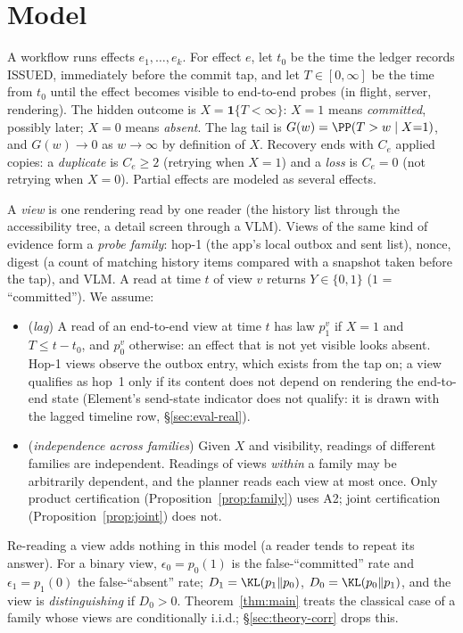 \section{Model}
\label{sec:model}

A workflow runs effects $e_1,\dots,e_k$. For effect $e$, let $t_0$ be the time the ledger records \textsf{ISSUED}, immediately before the commit tap,
and let $T\in[0,\infty]$ be the time from $t_0$ until the effect becomes visible to end-to-end probes (in flight, server, rendering).
The hidden outcome is $X=\mathbf 1\{T<\infty\}$: $X{=}1$ means \emph{committed}, possibly later; $X{=}0$ means \emph{absent}. The lag tail is
$G(w)=\PP(T>w\mid X{=}1)$, and $G(w)\to0$ as $w\to\infty$ by definition of $X$. Recovery ends with $C_e$ applied copies: a \emph{duplicate} is $C_e\ge2$
(retrying when $X{=}1$) and a \emph{loss} is $C_e=0$ (not retrying when $X{=}0$). Partial effects are modeled as several effects.

A \emph{view} is one rendering read by one reader (the history list through the accessibility tree, a detail screen through a VLM). Views of the same kind of evidence form a \emph{probe family}: hop-1 (the app's local outbox and sent list), nonce, digest
(a count of matching history items compared with a snapshot taken before the tap), and VLM. A read at time $t$ of view $v$ returns $Y\in\{0,1\}$ ($1$ = ``committed'').
We assume:
\begin{itemize}[leftmargin=*,topsep=1pt,itemsep=0pt]
\item[\textbf{A1}] (\emph{lag}) A read of an end-to-end view at time $t$ has law $p^v_1$ if $X{=}1$ and $T\le t-t_0$, and $p^v_0$ otherwise:
an effect that is not yet visible looks absent. Hop-1 views observe the outbox entry, which exists from the tap on; a view qualifies as hop~1 only if its content
does not depend on rendering the end-to-end state (Element's send-state indicator does not qualify: it is drawn with the lagged timeline row, \S\ref{sec:eval-real}).
\item[\textbf{A2}] (\emph{independence across families}) Given $X$ and visibility, readings of different families are independent.
Readings of views \emph{within} a family may be arbitrarily dependent, and the planner reads each view at most once. Only product certification
(Proposition~\ref{prop:family}) uses A2; joint certification (Proposition~\ref{prop:joint}) does not.
\end{itemize}
Re-reading a view adds nothing in this model (a reader tends to repeat its answer). For a binary view, $\epsilon_0=p_0(1)$ is the false-``committed'' rate and $\epsilon_1=p_1(0)$ the false-``absent'' rate;
$D_1=\KL(p_1\|p_0)$, $D_0=\KL(p_0\|p_1)$, and the view is \emph{distinguishing} if $D_0>0$. Theorem~\ref{thm:main} treats the classical case of a family whose
views are conditionally i.i.d.; \S\ref{sec:theory-corr} drops this.

